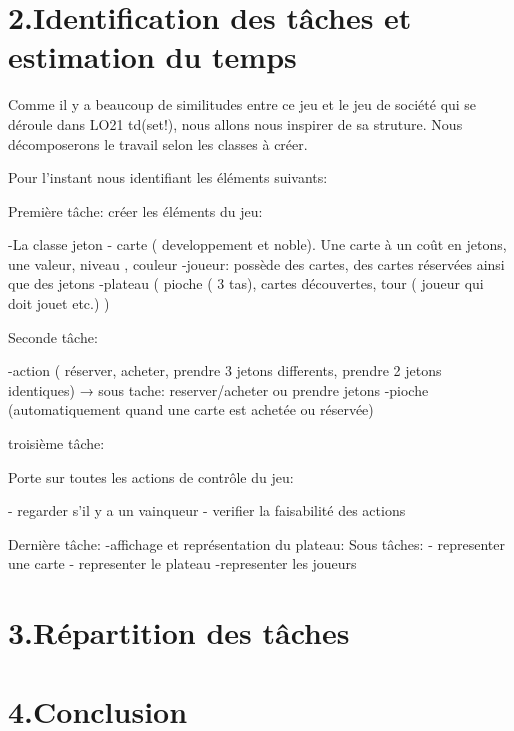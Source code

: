 \documentclass[a4paper]{article}
\begin{document}
\section*{2.Identification des tâches et estimation du temps}
Comme il y a beaucoup de similitudes entre ce jeu et le jeu de société qui se déroule dans LO21 td(set!), nous allons nous inspirer de sa struture.
Nous décomposerons le travail selon les classes à créer.

Pour l'instant nous identifiant les éléments suivants:

Première tâche: créer les éléments du jeu:

-La classe jeton
- carte ( developpement et noble).
    Une carte à un coût en jetons, une valeur, niveau , couleur 
-joueur: possède des cartes, des cartes réservées ainsi que des jetons
-plateau ( pioche ( 3 tas), cartes découvertes, tour ( joueur qui doit jouet etc.) )

Seconde tâche:

-action ( réserver, acheter, prendre 3 jetons differents, prendre 2 jetons identiques)
    → sous tache: reserver/acheter ou prendre jetons
-pioche (automatiquement quand une carte est achetée ou réservée)

troisième tâche:

Porte sur toutes les actions de contrôle du jeu:

- regarder s’il y a un vainqueur
- verifier la faisabilité des actions

Dernière tâche:
-affichage et représentation  du plateau:
 Sous tâches:
 - representer une carte
 - representer le plateau
 -representer les joueurs



\section*{3.Répartition des tâches}

\section*{4.Conclusion}






\end{document}
